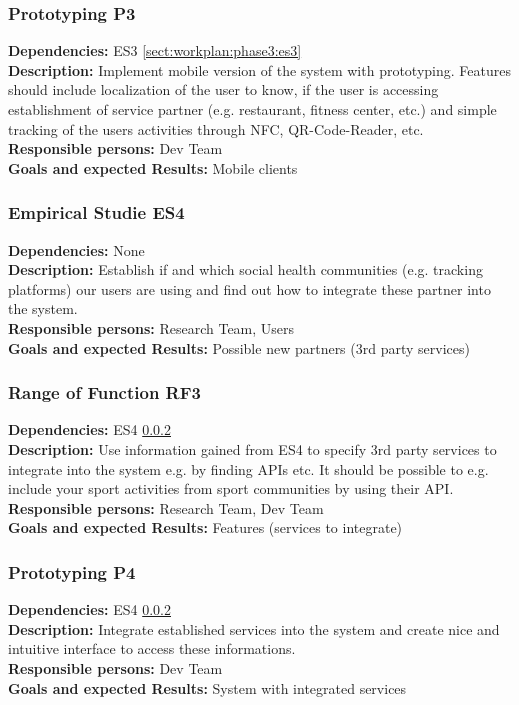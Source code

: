 \documentclass[a4paper,11pt]{article}
\begin{document}
\pagebreak
\subsubsection{Prototyping P3}
\label{sect:workplan:phase3:p3}
\textbf{Dependencies:} ES3 \ref{sect:workplan:phase3:es3}\\
\textbf{Description:} Implement mobile version of the system with prototyping. Features should include localization of the user to know, if the user is accessing establishment of service partner (e.g. restaurant, fitness center, etc.) and simple tracking of the users activities through NFC, QR-Code-Reader, etc.\\
\textbf{Responsible persons:} Dev Team\\
\textbf{Goals and expected Results:} Mobile clients\\

\subsubsection{Empirical Studie ES4}
\label{sect:workplan:phase3:es4}
\textbf{Dependencies:} None\\
\textbf{Description:} Establish if and which social health communities (e.g. tracking platforms) our users are using and find out how to integrate these partner into the system. \\
\textbf{Responsible persons:} Research Team, Users\\
\textbf{Goals and expected Results:} Possible new partners (3rd party services)\\

\subsubsection{Range of Function RF3}
\label{sect:workplan:phase3:rf3}
\textbf{Dependencies:} ES4 \ref{sect:workplan:phase3:es4}\\
\textbf{Description:} Use information gained from ES4 to specify 3rd party services to integrate into the system e.g. by finding APIs etc. It should be possible to e.g. include your sport activities from sport communities by using their API.\\
\textbf{Responsible persons:} Research Team, Dev Team\\
\textbf{Goals and expected Results:} Features (services to integrate)\\

\subsubsection{Prototyping P4}
\label{sect:workplan:phase3:p4}
\textbf{Dependencies:} ES4 \ref{sect:workplan:phase3:es4}\\
\textbf{Description:} Integrate established services into the system and create nice and intuitive interface to access these informations.\\
\textbf{Responsible persons:} Dev Team\\
\textbf{Goals and expected Results:} System with integrated services\\
\end{document}
